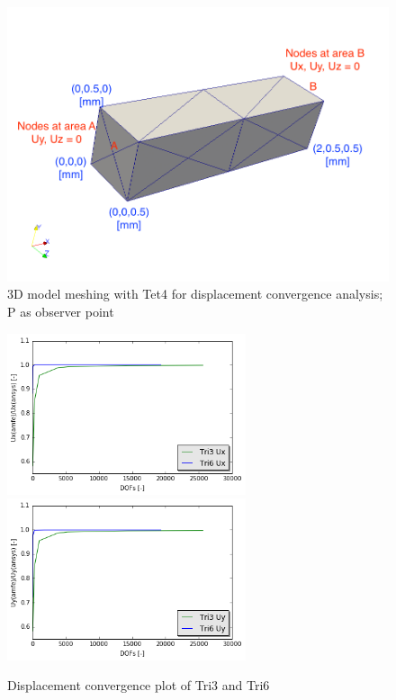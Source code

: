 \begin{figure}[htbp]
	\begin{center}	
		\includegraphics[width=14cm,clip]{Convergence3D1.png} 			
		\caption{3D model meshing with Tet4 for displacement convergence analysis; P as observer point} \label{fig: Convergence3D}
	\end{center}
\end{figure}

\begin{figure}[htbp]
	\begin{center}	
		\includegraphics[width=7cm,clip]{TriConPlotUx.png}
		\includegraphics[width=7cm,clip]{TriConPlotUy.png} 	 			
		\caption{Displacement convergence plot of Tri3 and Tri6} \label{fig: TriConPlot}
	\end{center}
\end{figure}

